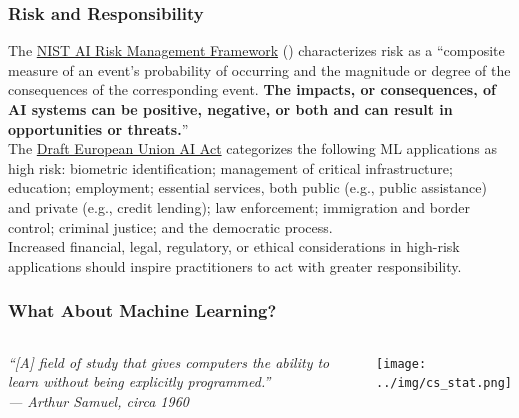 \documentclass[11pt,aspectratio=169,hyperref={colorlinks}]{beamer}
\begin{document}
		\begin{frame}
	
			\frametitle{Risk and Responsibility}
	
				\small{The \href{https://nvlpubs.nist.gov/nistpubs/ai/NIST.AI.100-1.pdf}{NIST AI Risk Management Framework} (\citet{tabassi2023artificial}) characterizes risk as a ``composite measure of an event’s probability of occurring and the magnitude or degree of the consequences of the corresponding event. \textbf{The impacts, or consequences, of AI systems can be positive, negative, or both and can result in opportunities or threats.}''}\\
				\vspace{10pt}
				\small{The \href{https://artificialintelligenceact.eu/}{Draft European Union AI Act} categorizes the following ML applications as high risk: biometric identification; management of critical infrastructure; education; employment; essential services, both public (e.g., public assistance) and private (e.g., credit lending); law enforcement; immigration and border control; criminal justice; and the democratic process.}\\
				\vspace{10pt}
				\small{Increased financial, legal, regulatory, or ethical considerations in high-risk applications should inspire practitioners to act with greater responsibility.}

		\end{frame}	

		\begin{frame}

			\frametitle{What About Machine Learning?}

			\begin{columns}
		
				\column{0.5\linewidth}
					\textit{``[A] field of study that gives computers the ability to learn without being explicitly programmed.''\\ \hspace{20pt} --- \textup{Arthur Samuel}, circa 1960}
	
				\column{0.5\linewidth}
						\centering
						\texttt{[image: ../img/cs\_stat.png]}
						\label{fig:cs_stat}

			\end{columns}
	
		\end{frame}	
\end{document}
